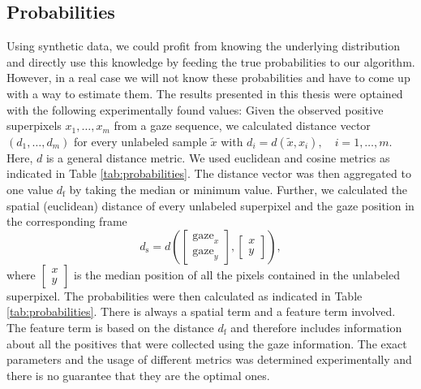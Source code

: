 \subsection*{Probabilities}
Using synthetic data, we could profit from knowing the underlying distribution and directly use this knowledge by feeding the true probabilities to our algorithm. 
However, in a real case we will not know these probabilities and have to come up with a way to estimate them. 
The results presented in this thesis were optained with the following experimentally found values:
Given the observed positive superpixels $x_1,\dots,x_m$ from a gaze sequence, we calculated distance vector $(d_1,\dots,d_m)$ for every unlabeled sample $\tilde x$ with $d_i = d(\tilde x, x_i), \quad i = 1,\dots,m.$
Here, $d$ is a general distance metric. We used euclidean and cosine metrics as indicated in Table \ref{tab:probabilities}. 
The distance vector was then aggregated to one value $d_{\text{f}}$ by taking the median or minimum value. 
Further, we calculated the spatial (euclidean) distance of every unlabeled superpixel and the gaze position in the corresponding frame 
$$d_\text{s} = d\left(\begin{bmatrix} \text{gaze}_x \\ \text{gaze}_y \end{bmatrix}, \begin{bmatrix} x \\ y \end{bmatrix}\right),$$
where $\begin{bmatrix} x \\ y \end{bmatrix}$ is the median position of all the pixels contained in the unlabeled superpixel.
The probabilities were then calculated as indicated in Table \ref{tab:probabilities}.
There is always a spatial term and a feature term involved. The feature term is based on the distance $d_{\text{f}}$ and therefore includes information about all the positives that were collected using the gaze information. The exact parameters and the usage of different metrics was determined experimentally and there is no guarantee that they are the optimal ones.
